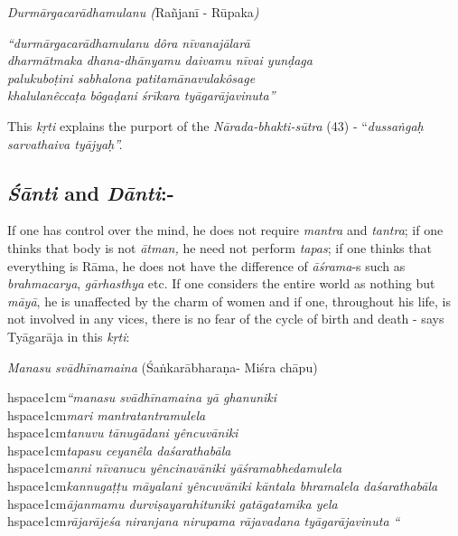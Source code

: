 \textit{Durmārgacarādhamulanu (}Rañjanī - Rūpaka\textit{)}

\begin{centerquote}
\textit{“durmārgacarādhamulanu dôra nīvanajālarā}\\ \textit{dharmātmaka dhana-dhānyamu daivamu nīvai yunḍaga}\\ \textit{palukuboṭini sabhalona patitamānavulakôsage}\\ \textit{khalulanêccaṭa bôgaḍani śrīkara tyāgarājavinuta”}
\end{centerquote}

This \textit{kṛti} explains the purport of the \textit{Nārada-bhakti-sūtra} (43) - “\textit{dussaṅgaḥ sarvathaiva tyājyaḥ”.}

\vspace{-.3cm}

\subsection*{\textit{Śānti} and \textit{Dānti}:-}

\vspace{-.3cm}

If one has control over the mind, he does not require \textit{mantra} and \textit{tantra}; if one thinks that body is not \textit{ātman,} he need not perform \textit{tapas}; if one thinks that everything is Rāma, he does not have the difference of \textit{āśrama}-s such as \textit{brahmacarya}, \textit{gārhasthya} etc. If one considers the entire world as nothing but \textit{māyā}, he is unaffected by the charm of women and if one, throughout his life, is not involved in any vices, there is no fear of the cycle of birth and death - says Tyāgarāja in this \textit{kṛti}:

\textit{Manasu svādhīnamaina} (Śaṅkarābharaṇa- Miśra chāpu)

\begin{myquote}
hspace{1cm}\textit{“manasu svādhīnamaina yā ghanuniki}\\ hspace{1cm}\textit{mari mantratantramulela}\\ hspace{1cm}\textit{tanuvu tānugādani yêncuvāniki}\\ hspace{1cm}\textit{tapasu ceyanêla daśarathabāla}\\ hspace{1cm}\textit{anni nīvanucu yêncinavāniki yāśramabhedamulela}\\ hspace{1cm}\textit{kannugaṭṭu māyalani yêncuvāniki kāntala bhramalela daśarathabāla}\\ hspace{1cm}\textit{ājanmamu durviṣayarahituniki gatāgatamika yela}\\ hspace{1cm}\textit{rājarājeśa niranjana nirupama rājavadana tyāgarājavinuta “}
\end{myquote}

